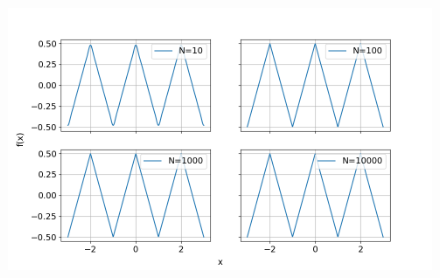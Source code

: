 \documentclass{article}
\begin{document}
\begin{figure}[h!]
    \centering
    \includegraphics[width=1.2\textwidth]{foutriawave.png} %
    \caption{}
    \label{fig:example}
\end{figure}
\end{document}
